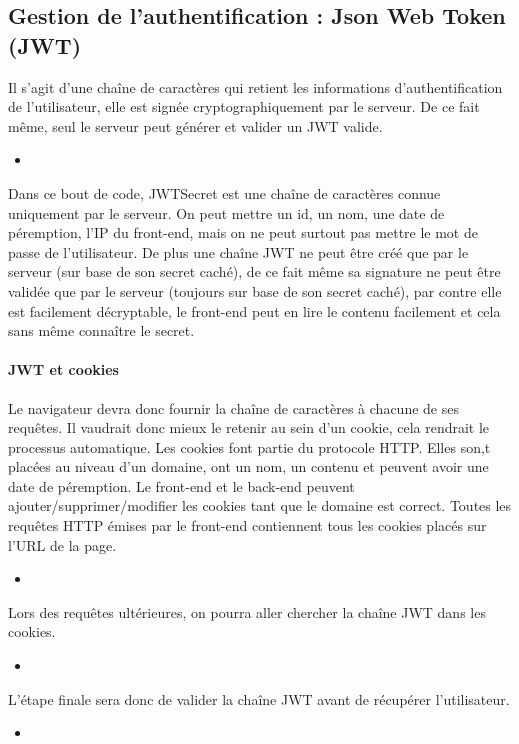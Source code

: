 \documentclass{article}[12pt]
\newcommand{\JavaScript}[2]{
	\begin{itemize}
		\item[]
	\end{itemize}
}
\begin{document}
\subsection{Gestion de l'authentification : Json Web Token (JWT)}
Il s'agit d'une chaîne de caractères qui retient les informations d'authentification de l'utilisateur, elle est signée cryptographiquement par le serveur. De ce fait même, seul le serveur peut générer et valider un JWT valide.
\newline
\newline
\JavaScript{creation_jwt}{Création de la chaîne JWT lors d'une authentification réussie}
Dans ce bout de code, JWTSecret est une chaîne de caractères connue uniquement par le serveur.
\newline
\newline
On peut mettre un id, un nom, une date de péremption, l'IP du front-end, mais on ne peut surtout pas mettre le mot de passe de l'utilisateur. De plus une chaîne JWT ne peut être créé que par le serveur (sur base de son secret caché), de ce fait même sa signature ne peut être validée que par le serveur (toujours sur base de son secret caché), par contre elle est facilement décryptable, le front-end peut en lire le contenu facilement et cela sans même connaître le secret.
\newline
\newline
\paragraph{JWT et cookies}
Le navigateur devra donc fournir la chaîne de caractères à chacune de ses requêtes. Il vaudrait donc mieux le retenir au sein d'un cookie, cela rendrait le processus automatique.
\newline
\newline
Les cookies font partie du protocole HTTP. Elles son,t placées au niveau d'un domaine, ont un nom, un contenu et peuvent avoir une date de péremption. Le front-end et le back-end peuvent ajouter/supprimer/modifier les cookies tant que le domaine est correct. Toutes les requêtes HTTP émises par le front-end contiennent tous les cookies placés sur l'URL de la page.
\JavaScript{creation_cookie}{Création d'un cookie contenant la chaîne JWT}
Lors des requêtes ultérieures, on pourra aller chercher la chaîne JWT dans les cookies.
\JavaScript{get_cookie}{Vérification de la présence du cookie}
L'étape finale sera donc de valider la chaîne JWT avant de récupérer l'utilisateur.
\JavaScript{check_jwt}{Vérification de la chaîne JWT}
\end{document}
